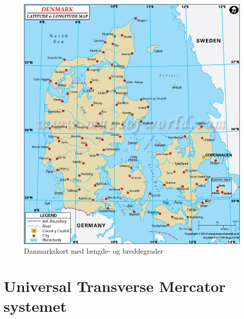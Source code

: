 \begin{figure} [h]
	\centering
	\includegraphics[width=.4\textwidth]{billeder/long-lat-denmark}
	\caption{Danmarkskort med længde- og breddegrader}
\end{figure}

\section{Universal Transverse Mercator systemet}

